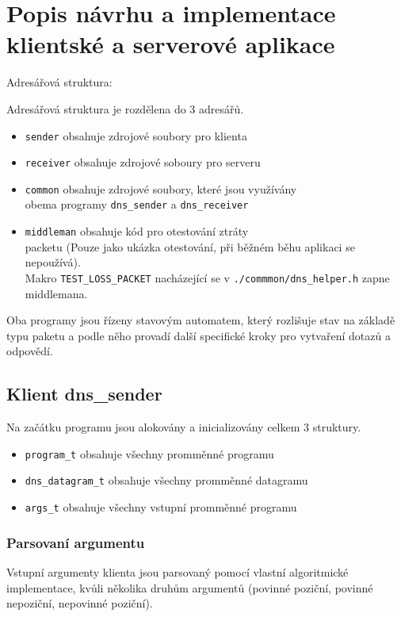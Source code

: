\section{Popis návrhu a implementace klientské a serverové aplikace}
\label{sec:popis-navrhu-a-implementace-klientske-a-serverove-aplikace}
Adresářová struktura:

Adresářová struktura je rozdělena do 3 adresářů.

\begin{itemize}
    \item \texttt{sender} \- obsahuje zdrojové soubory pro klienta
    \item \texttt{receiver} \- obsahuje zdrojové soboury pro serveru
    \item \texttt{common} \- obsahuje zdrojové soubory, které jsou využívány\\
    obema programy \texttt{dns\_sender} a \texttt{dns\_receiver}
    \item \texttt{middleman} \- obsahuje kód pro otestování ztráty \\
    packetu (Pouze jako ukázka otestování, při běžném běhu aplikaci se nepoužívá).\\
    Makro \texttt{TEST\_LOSS\_PACKET} nacházející se v \texttt{./commmon/dns\_helper.h} zapne middlemana.
\end{itemize}

Oba programy jsou řízeny stavovým automatem, který rozlišuje stav
na základě typu paketu a podle
něho provadí další specifické kroky pro vytvaření dotazů a odpovědí.



\subsection{Klient \- dns\_sender}
Na začátku programu jsou alokovány a inicializovány celkem 3 struktury.
\begin{itemize}
    \item \texttt{program\_t} \- obsahuje všechny promměnné programu
    \item \texttt{dns\_datagram\_t} \- obsahuje všechny promměnné datagramu
    \item \texttt{args\_t} \- obsahuje všechny vstupní promměnné programu
\end{itemize}

\subsubsection{Parsovaní argumentu} \label{sec:parsovani-argumentu-k}
Vstupní argumenty klienta jsou parsovaný pomocí vlastní algoritmické
implementace, kvůli několika druhům argumentů
(povinné poziční, povinné nepoziční, nepovinné poziční).

